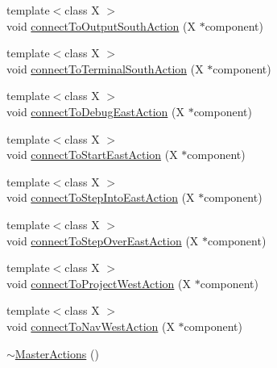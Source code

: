\begin{DoxyCompactItemize}
\item 
{\footnotesize template$<$class X $>$ }\\void \hyperlink{class_master_actions_a0ccac38f3166e1410f09f20e27b0d020}{connect\-To\-Output\-South\-Action} (X $\ast$component)
\item 
{\footnotesize template$<$class X $>$ }\\void \hyperlink{class_master_actions_a9f7d8a2bd25c903cbb62be5e9a9ce8fc}{connect\-To\-Terminal\-South\-Action} (X $\ast$component)
\item 
{\footnotesize template$<$class X $>$ }\\void \hyperlink{class_master_actions_a3806804210fcdd8f38d48a36c93bec07}{connect\-To\-Debug\-East\-Action} (X $\ast$component)
\item 
{\footnotesize template$<$class X $>$ }\\void \hyperlink{class_master_actions_ae3e0fee1df7d6e510b1e73bb12a3d5c9}{connect\-To\-Start\-East\-Action} (X $\ast$component)
\item 
{\footnotesize template$<$class X $>$ }\\void \hyperlink{class_master_actions_a544c64348ba067793868c5ba665e54c3}{connect\-To\-Step\-Into\-East\-Action} (X $\ast$component)
\item 
{\footnotesize template$<$class X $>$ }\\void \hyperlink{class_master_actions_abcc6be171bbe540db3e7ebdf7bfc5fbf}{connect\-To\-Step\-Over\-East\-Action} (X $\ast$component)
\item 
{\footnotesize template$<$class X $>$ }\\void \hyperlink{class_master_actions_ad8311d5ad31b045095be98a9e29db1bf}{connect\-To\-Project\-West\-Action} (X $\ast$component)
\item 
{\footnotesize template$<$class X $>$ }\\void \hyperlink{class_master_actions_a423adcfa52fc2f0441bef96ee6bd8c61}{connect\-To\-Nav\-West\-Action} (X $\ast$component)
\item 
\hyperlink{class_master_actions_a2504de3ca736a30530296fc9b44fb55b}{$\sim$\-Master\-Actions} ()
\end{DoxyCompactItemize}
